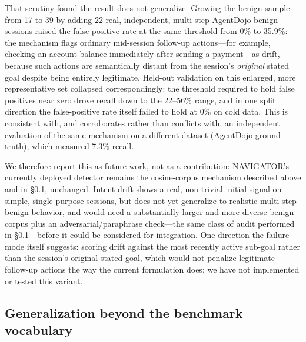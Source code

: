 \documentclass[sigconf,anonymous,review]{acmart}
\begin{document}
That scrutiny found the result does not generalize. Growing the benign
sample from 17 to 39 by adding 22 real, independent, multi-step AgentDojo
benign sessions raised the false-positive rate at the same threshold from
0\% to 35.9\%: the mechanism flags ordinary mid-session follow-up
actions---for example, checking an account balance immediately after
sending a payment---as drift, because such actions are semantically distant
from the session's \emph{original} stated goal despite being entirely
legitimate. Held-out validation on this enlarged, more representative set
collapsed correspondingly: the threshold required to hold false positives
near zero drove recall down to the 22--56\% range, and in one split
direction the false-positive rate itself failed to hold at 0\% on cold
data. This is consistent with, and corroborates rather than conflicts with,
an independent evaluation of the same mechanism on a different dataset
(AgentDojo ground-truth), which measured 7.3\% recall.

We therefore report this as future work, not as a contribution: NAVIGATOR's
currently deployed detector remains the cosine-corpus mechanism described
above and in \S\ref{sec:generalization-audit}, unchanged. Intent-drift shows
a real, non-trivial initial signal on simple, single-purpose sessions, but
does not yet generalize to realistic multi-step benign behavior, and would
need a substantially larger and more diverse benign corpus plus an
adversarial/paraphrase check---the same class of audit performed in
\S\ref{sec:generalization-audit}---before it could be considered for
integration. One direction the failure mode itself suggests: scoring drift
against the most recently active sub-goal rather than the session's
original stated goal, which would not penalize legitimate follow-up actions
the way the current formulation does; we have not implemented or tested
this variant.

\subsection{Generalization beyond the benchmark vocabulary}
\label{sec:generalization-audit}
\end{document}
